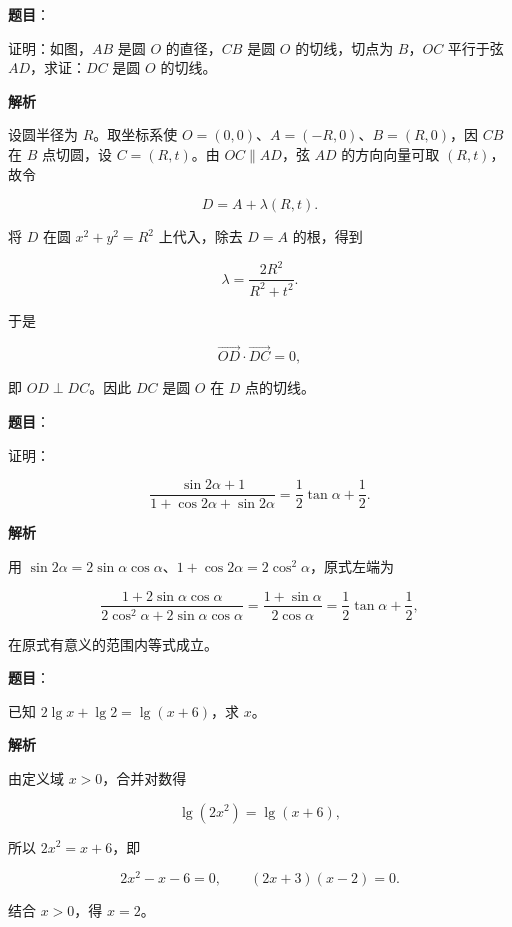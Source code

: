 \begin{answer}

\textbf{题目}：

证明：如图，$AB$ 是圆 $O$ 的直径，$CB$ 是圆 $O$ 的切线，切点为 $B$，$OC$ 平行于弦 $AD$，求证：$DC$ 是圆 $O$ 的切线。
\nopagebreak[4]
\begin{center}\end{center}
\nopagebreak[4]
\textbf{解析}

设圆半径为 $R$。取坐标系使 $O=(0,0)$、$A=(-R,0)$、$B=(R,0)$，因 $CB$ 在 $B$ 点切圆，设 $C=(R,t)$。由 $OC\parallel AD$，弦 $AD$ 的方向向量可取 $(R,t)$，故令

\nopagebreak[4]
\[
D=A+\lambda(R,t).
\]

将 $D$ 在圆 $x^2+y^2=R^2$ 上代入，除去 $D=A$ 的根，得到

\nopagebreak[4]
\[
\lambda=\frac{2R^2}{R^2+t^2}.
\]

于是

\nopagebreak[4]
\[
\overrightarrow{OD}\cdot\overrightarrow{DC}=0,
\]

即 $OD\perp DC$。因此 $DC$ 是圆 $O$ 在 $D$ 点的切线。


\end{answer}
\begin{answer}

\textbf{题目}：

证明：

\nopagebreak[4]
\[
\frac{\sin2\alpha+1}{1+\cos2\alpha+\sin2\alpha}=\frac12\tan\alpha+\frac12.
\]

\textbf{解析}

用 $\sin2\alpha=2\sin\alpha\cos\alpha$、$1+\cos2\alpha=2\cos^2\alpha$，原式左端为

\nopagebreak[4]
\[
\frac{1+2\sin\alpha\cos\alpha}{2\cos^2\alpha+2\sin\alpha\cos\alpha}
=\frac{1+\sin\alpha}{2\cos\alpha}
=\frac12\tan\alpha+\frac12,
\]

在原式有意义的范围内等式成立。


\end{answer}
\begin{answer}

\textbf{题目}：

已知 $2\lg x+\lg2=\lg(x+6)$，求 $x$。

\textbf{解析}

由定义域 $x>0$，合并对数得

\nopagebreak[4]
\[
\lg(2x^2)=\lg(x+6),
\]

所以 $2x^2=x+6$，即

\nopagebreak[4]
\[
2x^2-x-6=0,
\qquad
(2x+3)(x-2)=0.
\]

结合 $x>0$，得 $x=2$。


\end{answer}
